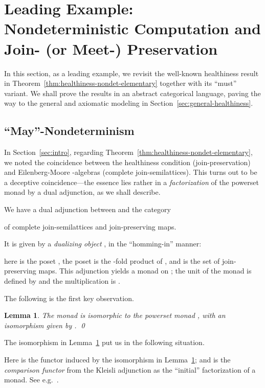 \documentclass[9pt, preprint]{sigplanconf}
\theoremstyle{theorem}
\newtheorem{lemma}[theorem]{Lemma}
\theoremstyle{definition}
\begin{document}
\section{Leading Example: Nondeterministic Computation and Join- (or
 Meet-) Preservation}
\label{sec:nondet}

In this section, as a leading example, we revisit the well-known
healthiness result in Theorem~\ref{thm:healthiness-nondet-elementary}
together with its ``must''
variant. We shall
 prove the results in an abstract categorical language, paving the way to the
 general and axiomatic modeling in
 Section~\ref{sec:general-healthiness}.

\subsection{``May''-Nondeterminism}
\label{sub:diamond-modality}
In Section~\ref{sec:intro}, regarding
Theorem~\ref{thm:healthiness-nondet-elementary}, we noted
the coincidence between the healthiness condition (join-preservation)
and Eilenberg-Moore -algebras (complete join-semilattices).
This turns out to be a deceptive coincidence---the essence lies rather
in a \emph{factorization} of the powerset monad  by a dual
adjunction, as we shall describe.

We have a dual adjunction between  and the category

of complete join-semilattices and join-preserving maps.

It is given by a \emph{dualizing object} , in the ``homming-in''
manner:

here  is the poset ,
the poset  is the  -fold product of ,
and  is the set of
join-preserving maps.
This adjunction yields a monad
 on ;
the unit  of the monad  is defined by 
and the multiplication  is
.





The following  is the first key observation.
\begin{lemma}
  \label{lem:monad-isom-jslat}
  The monad   is isomorphic to the powerset
 monad , with an isomorphism
  given by
  .
  \qed
\end{lemma}
\noindent
 The isomorphism in Lemma~\ref{lem:monad-isom-jslat} put us in the
 following situation.

Here  is
the
 functor induced by the isomorphism  in
 Lemma~\ref{lem:monad-isom-jslat}; and  is the \emph{comparison
 functor}
from the Kleisli adjunction as the
 ``initial'' factorization of a monad. See
 e.g.~\cite{MacLane71,BarrW85}.
\end{document}
